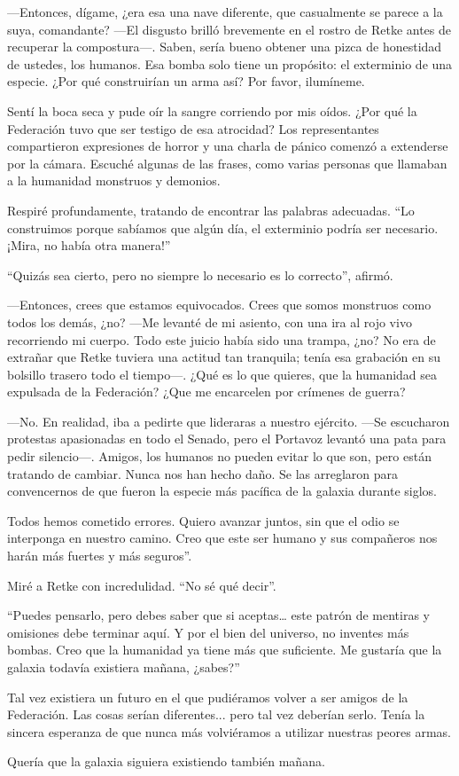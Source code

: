 —Entonces, dígame, ¿era esa una nave diferente, que casualmente se parece a la suya, comandante? —El disgusto brilló brevemente en el rostro de Retke antes de recuperar la compostura—. Saben, sería bueno obtener una pizca de honestidad de ustedes, los humanos. Esa bomba solo tiene un propósito: el exterminio de una especie. ¿Por qué construirían un arma así? Por favor, ilumíneme.

Sentí la boca seca y pude oír la sangre corriendo por mis oídos. ¿Por qué la Federación tuvo que ser testigo de esa atrocidad? Los representantes compartieron expresiones de horror y una charla de pánico comenzó a extenderse por la cámara. Escuché algunas de las frases, como varias personas que llamaban a la humanidad monstruos y demonios.

Respiré profundamente, tratando de encontrar las palabras adecuadas. ``Lo construimos porque sabíamos que algún día, el exterminio podría ser necesario. ¡Mira, no había otra manera!''

``Quizás sea cierto, pero no siempre lo necesario es lo correcto'', afirmó.

—Entonces, crees que estamos equivocados. Crees que somos monstruos como todos los demás, ¿no? —Me levanté de mi asiento, con una ira al rojo vivo recorriendo mi cuerpo. Todo este juicio había sido una trampa, ¿no? No era de extrañar que Retke tuviera una actitud tan tranquila; tenía esa grabación en su bolsillo trasero todo el tiempo—. ¿Qué es lo que quieres, que la humanidad sea expulsada de la Federación? ¿Que me encarcelen por crímenes de guerra?

—No. En realidad, iba a pedirte que lideraras a nuestro ejército. —Se escucharon protestas apasionadas en todo el Senado, pero el Portavoz levantó una pata para pedir silencio—. Amigos, los humanos no pueden evitar lo que son, pero están tratando de cambiar. Nunca nos han hecho daño. Se las arreglaron para convencernos de que fueron la especie más pacífica de la galaxia durante siglos.

Todos hemos cometido errores. Quiero avanzar juntos, sin que el odio se interponga en nuestro camino. Creo que este ser humano y sus compañeros nos harán más fuertes y más seguros''.

Miré a Retke con incredulidad. ``No sé qué decir''.

``Puedes pensarlo, pero debes saber que si aceptas… este patrón de mentiras y omisiones debe terminar aquí. Y por el bien del universo, no inventes más bombas. Creo que la humanidad ya tiene más que suficiente. Me gustaría que la galaxia todavía existiera mañana, ¿sabes?''

Tal vez existiera un futuro en el que pudiéramos volver a ser amigos de la Federación. Las cosas serían diferentes... pero tal vez deberían serlo. Tenía la sincera esperanza de que nunca más volviéramos a utilizar nuestras peores armas.

Quería que la galaxia siguiera existiendo también mañana.